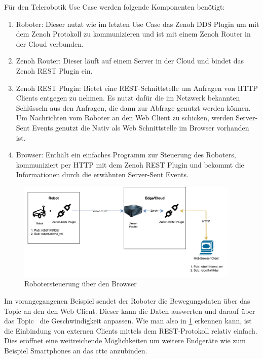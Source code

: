 Für den Telerobotik Use Case werden folgende Komponenten benötigt:

\begin{enumerate}
  \item Roboter: Dieser nutzt wie im letzten Use Case das Zenoh DDS Plugin um mit dem Zenoh Protokoll zu kommunizieren und ist mit einem Zenoh Router in der Cloud verbunden.
  \item Zenoh Router: Dieser läuft auf einem Server in der Cloud und bindet das Zenoh REST Plugin ein.
  \item Zenoh REST Plugin: Bietet eine REST-Schnittstelle um Anfragen von HTTP Clients entgegen zu nehmen. Es nutzt dafür die im Netzwerk bekannten Schlüsseln aus den Anfragen, die dann zur Abfrage genutzt werden können. Um Nachrichten vom Roboter an den Web Client zu schicken, werden Server-Sent Events genutzt die Nativ als Web Schnittstelle im Browser vorhanden ist.
  \item Browser: Enthält ein einfaches Programm zur Steuerung des Roboters, kommuniziert per HTTP mit dem Zenoh REST Plugin und bekommt die Informationen durch die erwähnten Server-Sent Events.
\end{enumerate}

\begin{figure}
  \begin{center}
    \includegraphics[width=0.95\textwidth]{figures/remote-steuerung.drawio.png}
  \end{center}
  \caption{Robotersteuerung über den Browser}
  \label{fig:Robotersteuerung über den Browser}
\end{figure}

Im vorangegangenen Beispiel sendet der Roboter die Bewegungsdaten über das Topic  an den den Web Client. Dieser kann die Daten auswerten und darauf über das Topic  die Geschwindigkeit anpassen.
Wie man also in \ref{fig:Robotersteuerung über den Browser} erkennen kann, ist die Einbindung von externen Clients mittels dem REST-Protokoll relativ einfach. Dies eröffnet eine weitreichende Möglichkeiten um weitere Endgeräte wie zum Beispiel Smartphones an das \acrlong{cttc} anzubinden.

